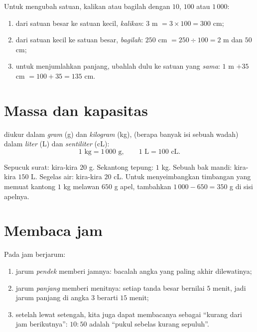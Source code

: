 \begin{method}\label{met:g3:measure:convert}
Untuk mengubah satuan, kalikan atau bagilah dengan $10$, $100$ atau $1\,000$:
\begin{enumerate}
  \item dari satuan besar ke satuan kecil, \emph{kalikan}:
        $3$ m $= 3 \times 100 = 300$ cm;
  \item dari satuan kecil ke satuan besar, \emph{bagilah}:
        $250$ cm $= 250 \div 100 = 2$ m dan $50$ cm;
  \item untuk menjumlahkan panjang, ubahlah dulu ke satuan yang
        \emph{sama}: $1$ m $+ 35$ cm $= 100 + 35 = 135$ cm.
\end{enumerate}
\end{method}

\section{Massa dan kapasitas}

\begin{definition}\label{def:g3:measure:mass}
 diukur dalam \emph{gram} (g) dan \emph{kilogram} (kg),
 (berapa banyak isi sebuah wadah) dalam \emph{liter} (L)
dan \emph{sentiliter} (cL):
\[
1 \text{ kg} = 1\,000 \text{ g},
\qquad
1 \text{ L} = 100 \text{ cL}.
\]
\end{definition}

\begin{example}\label{ex:g3:measure:mass}
Sepucuk surat: kira-kira $20$ g. Sekantong tepung: $1$ kg. Sebuah
bak mandi: kira-kira $150$ L. Segelas air: kira-kira $20$ cL. Untuk
menyeimbangkan timbangan yang memuat kantong $1$ kg melawan $650$ g
apel, tambahkan $1\,000 - 650 = 350$ g di sisi apelnya.
\end{example}

\section{Membaca jam}

\begin{method}\label{met:g3:measure:clock}
Pada jam berjarum:
\begin{enumerate}
  \item jarum \emph{pendek} memberi jamnya: bacalah angka yang
        paling akhir dilewatinya;
  \item jarum \emph{panjang} memberi menitnya: setiap tanda besar
        bernilai $5$ menit, jadi jarum panjang di angka $3$ berarti
        $15$ menit;
  \item setelah lewat setengah, kita juga dapat membacanya sebagai
        ``kurang dari jam berikutnya'': $10{:}50$ adalah ``pukul
        sebelas kurang sepuluh''.
\end{enumerate}
\end{method}

